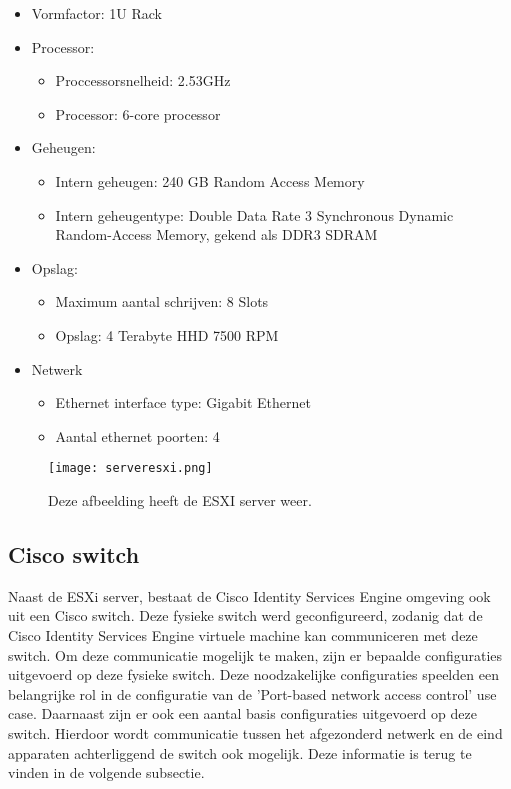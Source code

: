 \begin{itemize}
	\item Vormfactor: 1U Rack
	\item Processor:
	\begin{itemize}
		\item Proccessorsnelheid: 2.53GHz
		\item Processor: 6-core processor
	\end{itemize}
	\item Geheugen:
	\begin{itemize}
		\item Intern geheugen: 240 GB Random Access Memory
		\item Intern geheugentype: Double Data Rate 3 Synchronous Dynamic Random-Access Memory, gekend als DDR3 SDRAM
	\end{itemize}
	\item Opslag:
	\begin{itemize}
		\item Maximum aantal schrijven: 8 Slots
		\item Opslag: 4 Terabyte HHD 7500 RPM
	\end{itemize}
	\item Netwerk
	\begin{itemize}
		\item Ethernet interface type: Gigabit Ethernet
		\item Aantal ethernet poorten: 4 
	\end{itemize}
\end{itemize}

\begin{figure}[H]
	\centering
	\texttt{[image: serveresxi.png]}
	\caption{Deze afbeelding heeft de ESXI server weer. }
\end{figure}

\subsection{Cisco switch}
Naast de ESXi server, bestaat de Cisco Identity Services Engine omgeving ook uit een Cisco switch. Deze fysieke switch werd geconfigureerd, zodanig dat de Cisco Identity Services Engine virtuele machine kan communiceren met deze switch. Om deze communicatie mogelijk te maken, zijn er bepaalde configuraties uitgevoerd op deze fysieke switch. Deze noodzakelijke configuraties speelden een belangrijke rol in de configuratie van de 'Port-based network access control' use case. 
\newline
\newline
Daarnaast zijn er ook een aantal basis configuraties uitgevoerd op deze switch. Hierdoor wordt communicatie tussen het afgezonderd netwerk en de eind apparaten achterliggend de switch ook mogelijk. Deze informatie is terug te vinden in de volgende subsectie.  

